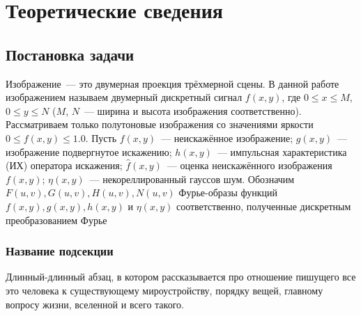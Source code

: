 \chapter{Теоретические сведения}

\section{Постановка задачи}

Изображение~--- это двумерная проекция трёхмерной сцены. В данной работе изображением называем двумерный дискретный сигнал $f(x,y)$, где $0\leq x \leq M$, $0\leq y\leq N$ ($M$, $N$~--- ширина и высота изображения соответственно). Рассматриваем только полутоновые изображения со значениями яркости $0\leq f(x,y)\leq 1.0$. Пусть $f(x,y)$~--- неискажённое изображение; $g(x,y)$~--- изображение подвергнутое искажению; $h(x,y)$~--- импульсная характеристика (ИХ) оператора искажения; $\hat{f}(x,y)$~--- оценка неискажённого изображения $f(x,y)$; $\eta(x,y)$~--- некореллированный гауссов шум.
Обозначим $F(u,v), G(u,v), H(u,v), N(u,v)$ Фурье-образы функций $f(x,y), g(x,y), h(x,y)$ и $\eta(x,y)$ соответственно, полученные дискретным преобразованием Фурье \cite[p.~284]{gonsalesDigital}

\begin{comment}
Изображение — это двумерная проекция трёхменой сцены, подлежащей съём-
ке. В данной работе под изображением мы понимаем двумерный дискретный сиг-
нал f (x, y) , где 0 ≤ x ≤ M , 0 ≤ y ≤ N ( M , N — ширина и высота
изображения соответственно). Рассматриваем только полутоновые изображения, где
0 ≤ f (x, y) ≤ 255 — яркость пикселя в точке с координатами (x, y) .
Пусть f (x, y) — неискажённое изображение; g(x, y) — искажённое изображе-
ние; h(x, y) — импульсная характеристика (ИХ) оператора искажения; f ^ (x, y) —
оценка изображения f (x, y) и η(x, y) — некоррелированный шум. Фурье-образы
функций f (x, y) , g(x, y) , h(x, y) , η(x, y) , полученных с помощью дискретного пре-
образования Фурье [1, c. 284], обозначим соответственно F (u, v) , G(u, v) , H(u, v)
и N (u, v) . Допускаем, что процесс формирования искажённого изображения g(x, y)
линейный и его можно описать с помощью линейной дискретной системы [1, c. 403]
(см. рис. 1.1):
\end{comment}


\subsection{Название подсекции}

Длинный-длинный абзац, в котором рассказывается про отношение пишущего все это человека к существующему мироустройству, порядку вещей, главному вопросу жизни, вселенной и всего такого.
